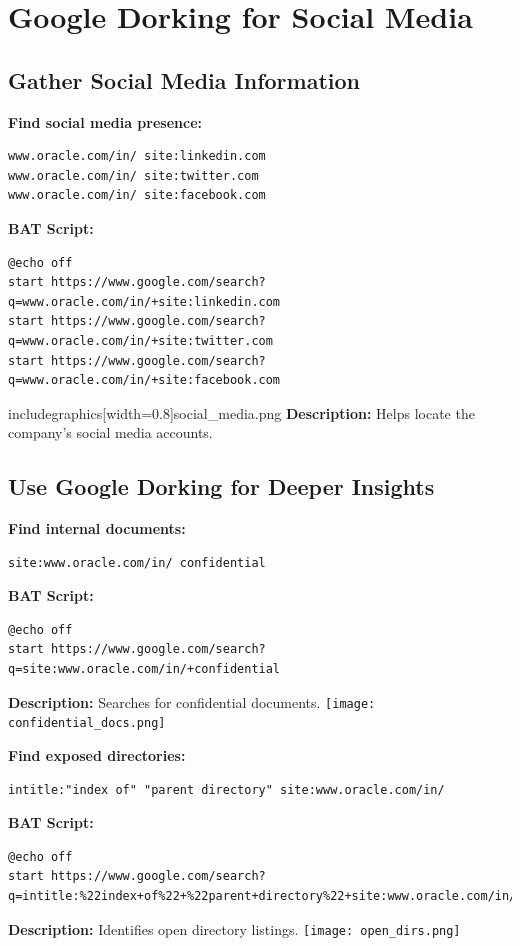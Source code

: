 \documentclass{article}
\begin{document}
\newpage
\section{Google Dorking for Social Media}
\subsection{Gather Social Media Information}
\textbf{Find social media presence:}
\begin{lstlisting}
www.oracle.com/in/ site:linkedin.com
www.oracle.com/in/ site:twitter.com
www.oracle.com/in/ site:facebook.com
\end{lstlisting}
\textbf{BAT Script:}
\begin{lstlisting}
@echo off
start https://www.google.com/search?q=www.oracle.com/in/+site:linkedin.com
start https://www.google.com/search?q=www.oracle.com/in/+site:twitter.com
start https://www.google.com/search?q=www.oracle.com/in/+site:facebook.com
\end{lstlisting}
includegraphics[width=0.8\textwidth]{social_media.png}
\newline
\textbf{Description:} Helps locate the company's social media accounts.
\

\subsection{Use Google Dorking for Deeper Insights}
\textbf{Find internal documents:}
\begin{lstlisting}
site:www.oracle.com/in/ confidential
\end{lstlisting}
\textbf{BAT Script:}
\begin{lstlisting}
@echo off
start https://www.google.com/search?q=site:www.oracle.com/in/+confidential
\end{lstlisting}
\textbf{Description:} Searches for confidential documents.
\texttt{[image: confidential\_docs.png]}

\textbf{Find exposed directories:}
\begin{lstlisting}
intitle:"index of" "parent directory" site:www.oracle.com/in/
\end{lstlisting}
\textbf{BAT Script:}
\begin{lstlisting}
@echo off
start https://www.google.com/search?q=intitle:%22index+of%22+%22parent+directory%22+site:www.oracle.com/in/
\end{lstlisting}
\textbf{Description:} Identifies open directory listings.
\texttt{[image: open\_dirs.png]}
\end{document}
